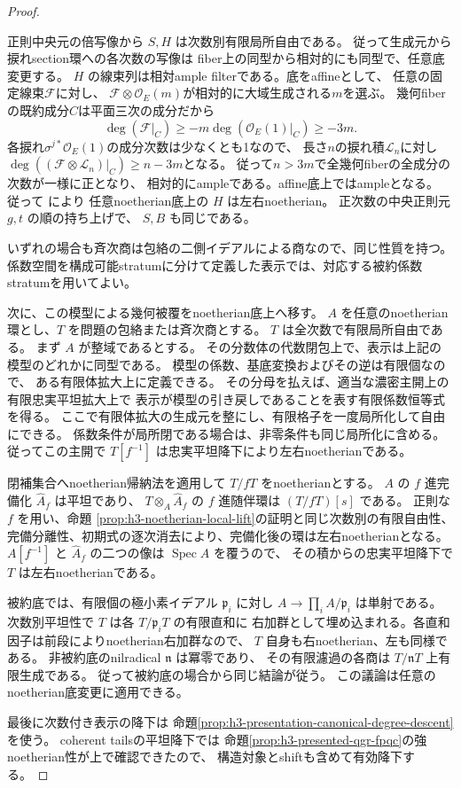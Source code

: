 \begin{proof}
\begin{itemize}
正則中央元の倍写像から $S,H$ は次数別有限局所自由である。
従って生成元から捩れsection環への各次数の写像は
fiber上の同型から相対的にも同型で、任意底変更する。
$H$ の線束列は相対ample filterである。底をaffineとして、
任意の固定線束$\mathcal F$に対し、
$\mathcal F\otimes\mathcal O_E(m)$が相対的に大域生成される$m$を選ぶ。
幾何fiberの既約成分$C$は平面三次の成分だから
\[
 \deg(\mathcal F|_C)\ge -m\deg(\mathcal O_E(1)|_C)\ge-3m.
\]
各捩れ$\sigma^{j*}\mathcal O_E(1)$の成分次数は少なくとも1なので、
長さ$n$の捩れ積$\mathcal L_n$に対し
$\deg((\mathcal F\otimes\mathcal L_n)|_C)\ge n-3m$となる。
従って$n>3m$で全幾何fiberの全成分の次数が一様に正となり、
相対的にampleである。affine底上ではampleとなる。
従って \cite[定理1.3, 7.14]{KeelerAmpleFilters}により
任意noetherian底上の $H$ は左右noetherian。
正次数の中央正則元 $g,t$ の順の持ち上げで、
$S,B$ も同じである。
\end{itemize}
いずれの場合も斉次商は包絡の二側イデアルによる商なので、同じ性質を持つ。
係数空間を構成可能stratumに分けて定義した表示では、対応する被約係数stratumを用いてよい。

次に、この模型による幾何被覆をnoetherian底上へ移す。
$A$ を任意のnoetherian環とし、$T$ を問題の包絡または斉次商とする。
$T$ は全次数で有限局所自由である。
まず $A$ が整域であるとする。
その分数体の代数閉包上で、表示は上記の模型のどれかに同型である。
模型の係数、基底変換およびその逆は有限個なので、
ある有限体拡大上に定義できる。
その分母を払えば、適当な濃密主開上の有限忠実平坦拡大上で
表示が模型の引き戻しであることを表す有限係数恒等式を得る。
ここで有限体拡大の生成元を整にし、有限格子を一度局所化して自由にできる。
係数条件が局所閉である場合は、非零条件も同じ局所化に含める。
従ってこの主開で $T[f^{-1}]$ は忠実平坦降下により左右noetherianである。

閉補集合へnoetherian帰納法を適用して $T/fT$ をnoetherianとする。
$A$ の $f$ 進完備化 $\widehat A_f$ は平坦であり、
$T\otimes_A\widehat A_f$ の $f$ 進随伴環は $(T/fT)[s]$ である。
正則な $f$ を用い、命題
\ref{prop:h3-noetherian-local-lift}の証明と同じ次数別の有限自由性、
完備分離性、初期式の逐次消去により、完備化後の環は左右noetherianとなる。
$A[f^{-1}]$ と $\widehat A_f$ の二つの像は $\operatorname{Spec}A$ を覆うので、
その積からの忠実平坦降下で $T$ は左右noetherianである。

被約底では、有限個の極小素イデアル $\mathfrak p_i$ に対し
$A\to\prod_i A/\mathfrak p_i$ は単射である。
次数別平坦性で $T$ は各 $T/\mathfrak p_iT$ の有限直和に
右加群として埋め込まれる。各直和因子は前段によりnoetherian右加群なので、
$T$ 自身も右noetherian、左も同様である。
非被約底のnilradical $\mathfrak n$ は冪零であり、
その有限濾過の各商は $T/\mathfrak nT$ 上有限生成である。
従って被約底の場合から同じ結論が従う。
この議論は任意のnoetherian底変更に適用できる。

最後に次数付き表示の降下は
命題\ref{prop:h3-presentation-canonical-degree-descent}を使う。
coherent tailsの平坦降下では
命題\ref{prop:h3-presented-qgr-fpqc}の強noetherian性が上で確認できたので、
構造対象とshiftも含めて有効降下する。
\end{proof}
